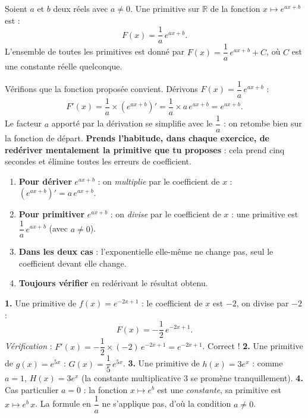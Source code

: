 \documentclass[11pt]{article}
\begin{document}
\begin{propriete}[Primitive de $e^{ax+b}$]
Soient $a$ et $b$ deux réels avec $a \neq 0$. Une primitive sur $\mathbb{R}$ de la fonction $x \longmapsto e^{ax+b}$ est :
\[ F(x) = \frac{1}{a}\,e^{ax+b}. \]
L'ensemble de toutes les primitives est donné par $F(x) = \dfrac{1}{a}\,e^{ax+b} + C$, où $C$ est une constante réelle quelconque.
\end{propriete}

\begin{experience}
Vérifions que la fonction proposée convient. Dérivons $F(x) = \dfrac{1}{a}\,e^{ax+b}$ :
\[ F'(x) = \frac{1}{a} \times \left(e^{ax+b}\right)' = \frac{1}{a} \times a\,e^{ax+b} = e^{ax+b}. \]
Le facteur $a$ apporté par la dérivation se simplifie avec le $\dfrac{1}{a}$ : on retombe bien sur la fonction de départ. \textbf{Prends l'habitude, dans chaque exercice, de redériver mentalement la primitive que tu proposes} : cela prend cinq secondes et élimine toutes les erreurs de coefficient.
\end{experience}

\begin{methode}
\begin{enumerate}
\item \textbf{Pour dériver} $e^{ax+b}$ : on \emph{multiplie} par le coefficient de $x$ : $\left(e^{ax+b}\right)' = a\,e^{ax+b}$.
\item \textbf{Pour primitiver} $e^{ax+b}$ : on \emph{divise} par le coefficient de $x$ : une primitive est $\dfrac{1}{a}\,e^{ax+b}$ (avec $a \neq 0$).
\item \textbf{Dans les deux cas} : l'exponentielle elle-même ne change pas, seul le coefficient devant elle change.
\item \textbf{Toujours vérifier} en redérivant le résultat obtenu.
\end{enumerate}
\end{methode}

\begin{exemplebox}
\textbf{1.} Une primitive de $f(x) = e^{-2x+1}$ : le coefficient de $x$ est $-2$, on divise par $-2$ :
\[ F(x) = -\frac{1}{2}\,e^{-2x+1}. \]
\emph{Vérification} : $F'(x) = -\dfrac{1}{2} \times (-2)\,e^{-2x+1} = e^{-2x+1}$. Correct !
\textbf{2.} Une primitive de $g(x) = e^{5x}$ : $G(x) = \dfrac{1}{5}\,e^{5x}$.
\textbf{3.} Une primitive de $h(x) = 3e^{x}$ : comme $a = 1$, $H(x) = 3e^{x}$ (la constante multiplicative $3$ se promène tranquillement).
\textbf{4.} Cas particulier $a = 0$ : la fonction $x \mapsto e^{b}$ est une \emph{constante}, sa primitive est $x \mapsto e^{b}\,x$. La formule en $\dfrac{1}{a}$ ne s'applique pas, d'où la condition $a \neq 0$.
\end{exemplebox}
\end{document}
